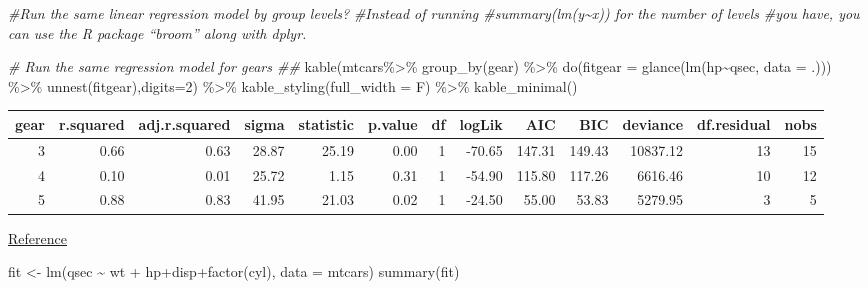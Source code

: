 \documentclass[
]{article}
\newenvironment{Shaded}{\begin{snugshade}}{\end{snugshade}}
\newcommand{\AttributeTok}[1]{\textcolor[rgb]{0.77,0.63,0.00}{#1}}
\newcommand{\CommentTok}[1]{\textcolor[rgb]{0.56,0.35,0.01}{\textit{#1}}}
\newcommand{\DecValTok}[1]{\textcolor[rgb]{0.00,0.00,0.81}{#1}}
\newcommand{\FunctionTok}[1]{\textcolor[rgb]{0.00,0.00,0.00}{#1}}
\newcommand{\NormalTok}[1]{#1}
\newcommand{\OtherTok}[1]{\textcolor[rgb]{0.56,0.35,0.01}{#1}}
\newcommand{\SpecialCharTok}[1]{\textcolor[rgb]{0.00,0.00,0.00}{#1}}
\begin{document}
\begin{Shaded}
\begin{Highlighting}[]
\CommentTok{\#Run the same linear regression model by group levels? }
\CommentTok{\#Instead of running \#summary(lm(y\textasciitilde{}x)) for the number of levels }
\CommentTok{\#you have, you can use the R package “broom” along with dplyr.}

\CommentTok{\# Run the same regression model for gears \#\#}
\FunctionTok{kable}\NormalTok{(mtcars}\SpecialCharTok{\%\textgreater{}\%} \FunctionTok{group\_by}\NormalTok{(gear) }\SpecialCharTok{\%\textgreater{}\%}
  \FunctionTok{do}\NormalTok{(}\AttributeTok{fitgear =} \FunctionTok{glance}\NormalTok{(}\FunctionTok{lm}\NormalTok{(hp}\SpecialCharTok{\textasciitilde{}}\NormalTok{qsec, }\AttributeTok{data =}\NormalTok{ .))) }\SpecialCharTok{\%\textgreater{}\%} 
  \FunctionTok{unnest}\NormalTok{(fitgear),}\AttributeTok{digits=}\DecValTok{2}\NormalTok{) }\SpecialCharTok{\%\textgreater{}\%}   \FunctionTok{kable\_styling}\NormalTok{(}\AttributeTok{full\_width =}\NormalTok{ F) }\SpecialCharTok{\%\textgreater{}\%} 
  \FunctionTok{kable\_minimal}\NormalTok{()}
\end{Highlighting}
\end{Shaded}

\begin{table}
\centering
\begin{tabular}{r|r|r|r|r|r|r|r|r|r|r|r|r}
\hline
gear & r.squared & adj.r.squared & sigma & statistic & p.value & df & logLik & AIC & BIC & deviance & df.residual & nobs\\
\hline
3 & 0.66 & 0.63 & 28.87 & 25.19 & 0.00 & 1 & -70.65 & 147.31 & 149.43 & 10837.12 & 13 & 15\\
\hline
4 & 0.10 & 0.01 & 25.72 & 1.15 & 0.31 & 1 & -54.90 & 115.80 & 117.26 & 6616.46 & 10 & 12\\
\hline
5 & 0.88 & 0.83 & 41.95 & 21.03 & 0.02 & 1 & -24.50 & 55.00 & 53.83 & 5279.95 & 3 & 5\\
\hline
\end{tabular}
\end{table}

\href{https://stackoverflow.com/questions/22713325/fitting-several-regression-models-with-dplyr}{Reference}

\begin{Shaded}
\begin{Highlighting}[]
\NormalTok{fit }\OtherTok{\textless{}{-}} \FunctionTok{lm}\NormalTok{(qsec }\SpecialCharTok{\textasciitilde{}}\NormalTok{ wt }\SpecialCharTok{+}\NormalTok{ hp}\SpecialCharTok{+}\NormalTok{disp}\SpecialCharTok{+}\FunctionTok{factor}\NormalTok{(cyl), }\AttributeTok{data =}\NormalTok{ mtcars)}
\FunctionTok{summary}\NormalTok{(fit)}
\end{Highlighting}
\end{Shaded}
\end{document}
